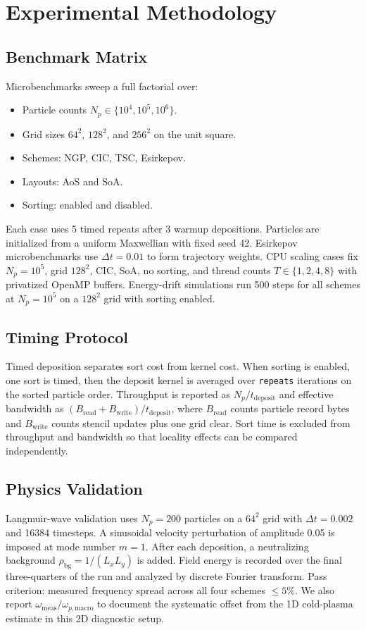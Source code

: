 \section{Experimental Methodology}
\label{sec:methodology}

\subsection{Benchmark Matrix}
Microbenchmarks sweep a full factorial over:
\begin{itemize}
    \item Particle counts $N_p \in \{10^4, 10^5, 10^6\}$.
    \item Grid sizes $64^2$, $128^2$, and $256^2$ on the unit square.
    \item Schemes: NGP, CIC, TSC, Esirkepov.
    \item Layouts: AoS and SoA.
    \item Sorting: enabled and disabled.
\end{itemize}
Each case uses 5 timed repeats after 3 warmup depositions.
Particles are initialized from a uniform Maxwellian with fixed seed 42.
Esirkepov microbenchmarks use $\Delta t = 0.01$ to form trajectory weights.
CPU scaling cases fix $N_p=10^5$, grid $128^2$, CIC, SoA, no sorting, and thread counts $T \in \{1,2,4,8\}$ with privatized OpenMP buffers.
Energy-drift simulations run 500 steps for all schemes at $N_p=10^5$ on a $128^2$ grid with sorting enabled.

\subsection{Timing Protocol}
Timed deposition separates sort cost from kernel cost.
When sorting is enabled, one sort is timed, then the deposit kernel is averaged over \texttt{repeats} iterations on the sorted particle order.
Throughput is reported as $N_p / t_{\mathrm{deposit}}$ and effective bandwidth as $(B_{\mathrm{read}}+B_{\mathrm{write}})/t_{\mathrm{deposit}}$, where $B_{\mathrm{read}}$ counts particle record bytes and $B_{\mathrm{write}}$ counts stencil updates plus one grid clear.
Sort time is excluded from throughput and bandwidth so that locality effects can be compared independently.

\subsection{Physics Validation}
Langmuir-wave validation uses $N_p=200$ particles on a $64^2$ grid with $\Delta t=0.002$ and 16384 timesteps.
A sinusoidal velocity perturbation of amplitude 0.05 is imposed at mode number $m=1$.
After each deposition, a neutralizing background $\rho_{\mathrm{bg}} = 1/(L_x L_y)$ is added.
Field energy is recorded over the final three-quarters of the run and analyzed by discrete Fourier transform.
Pass criterion: measured frequency spread across all four schemes $\leq 5\%$.
We also report $\omega_{\mathrm{meas}}/\omega_{p,\mathrm{macro}}$ to document the systematic offset from the 1D cold-plasma estimate in this 2D diagnostic setup.

